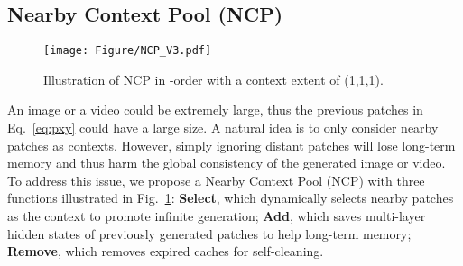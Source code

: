 \documentclass{article}
\begin{document}
\subsection{Nearby Context Pool (NCP)}\label{sec:ncp}

\begin{figure}[htbp]
    \centering
    \texttt{[image: Figure/NCP\_V3.pdf]}
    \caption{Illustration of NCP in -order with a context extent of (1,1,1). 
    }
\label{fig:ncp_demo}
\end{figure}

An image or a video could be extremely large, thus the previous patches  in Eq.~\ref{eq:pxy} could have a large size. A natural idea is to only consider nearby patches as contexts. However, simply ignoring distant patches will lose long-term memory and thus harm the global consistency of the generated image or video. 
To address this issue, we propose a Nearby Context Pool (NCP) with three functions illustrated in Fig.~\ref{fig:ncp_demo}: 
\textbf{Select}, which dynamically selects nearby patches as the context to promote infinite generation; 
\textbf{Add}, which saves multi-layer hidden states of previously generated patches to help long-term memory; 
\textbf{Remove}, which removes expired caches for self-cleaning.
\end{document}
